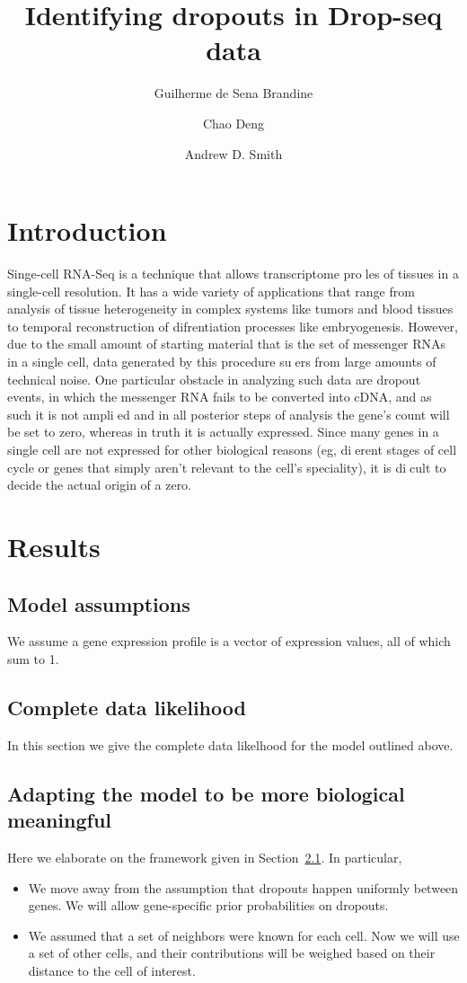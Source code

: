 \documentclass[11pt]{article}
\title{Identifying dropouts in Drop-seq data}
\author{Guilherme de Sena Brandine \and Chao Deng \and Andrew D. Smith}
\begin{document}
\maketitle

\section{Introduction}

Singe-cell RNA-Seq is a technique that allows transcriptome proles
of tissues in a single-cell resolution. It has a wide variety of
applications that range from analysis of tissue heterogeneity in
complex systems like tumors and blood tissues to temporal
reconstruction of difrentiation processes like embryogenesis. However,
due to the small amount of starting material that is the set of
messenger RNAs in a single cell, data generated by this procedure
suers from large amounts of technical noise.  One particular
obstacle in analyzing such data are dropout events, in which the
messenger RNA fails to be converted into cDNA, and as such it is not
amplied and in all posterior steps of analysis the gene's count will
be set to zero, whereas in truth it is actually expressed. Since many
genes in a single cell are not expressed for other biological reasons
(eg, dierent stages of cell cycle or genes that simply aren't
relevant to the cell's speciality), it is dicult to decide the
actual origin of a zero.

\section{Results}

\subsection{Model assumptions}
\label{sec:assumptions}

We assume a gene expression profile is a vector of expression values,
all of which sum to 1.

\subsection{Complete data likelihood}

In this section we give the complete data likelhood for the model
outlined above.

\subsection{Adapting the model to be more biological meaningful}

Here we elaborate on the framework given in
Section~\ref{sec:assumptions}. In particular,
\begin{itemize}
\item We move away from the assumption that dropouts happen uniformly
  between genes. We will allow gene-specific prior probabilities on
  dropouts.
\item We assumed that a set of neighbors were known for each cell.
  Now we will use a set of other cells, and their contributions will
  be weighed based on their distance to the cell of interest.
\end{itemize}
\end{document}
